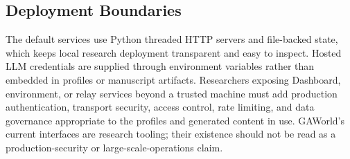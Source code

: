 \subsection{Deployment Boundaries}

The default services use Python threaded HTTP servers and file-backed state,
which keeps local research deployment transparent and easy to inspect.  Hosted
LLM credentials are supplied through environment variables rather than embedded
in profiles or manuscript artifacts.  Researchers exposing Dashboard,
environment, or relay services beyond a trusted machine must add production
authentication, transport security, access control, rate limiting, and data
governance appropriate to the profiles and generated content in use.  GAWorld's
current interfaces are research tooling; their existence should not be read as
a production-security or large-scale-operations claim.
